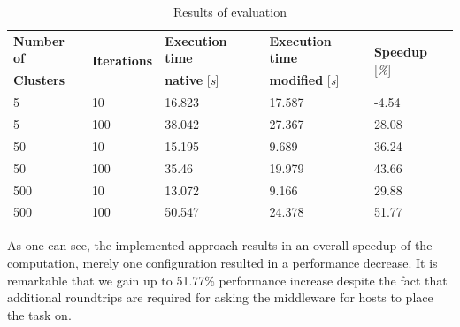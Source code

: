 \begin{table}[h]
    \centering
    \begin{tabular}{| l | l | l | l | l | }
        \hline
        \textbf{Number of} & \multirow{2}{*}{{\textbf{Iterations}}} & \textbf{Execution time}
            & \textbf{Execution time} & \multirow{2}{*}{\textbf{Speedup} [\textit{\%}]} \\
        \textbf{Clusters} & & \textbf{native} [\textit{s}]
            & \textbf{modified} [\textit{s}] & \\ \hline

        5 & 10 & 16.823 & 17.587 & -4.54 \\ \hline
        5 & 100 & 38.042 & 27.367 & 28.08 \\ \hline
        50 &10 &15.195 &9.689 &36.24 \\ \hline
        50 &100 &35.46 &19.979 &43.66 \\ \hline
        500 &10 &13.072 &9.166 &29.88 \\ \hline
        500 &100 &50.547 &24.378 &51.77 \\ \hline
    \end{tabular}
    \caption{Results of evaluation}
    \label{table:results}
\end{table}

As one can see, the implemented approach results in an overall speedup of the computation, merely
one configuration resulted in a performance decrease. It is remarkable that we gain up to 51.77\%
performance increase despite the fact that additional roundtrips are required for asking the
middleware for hosts to place the task on.
